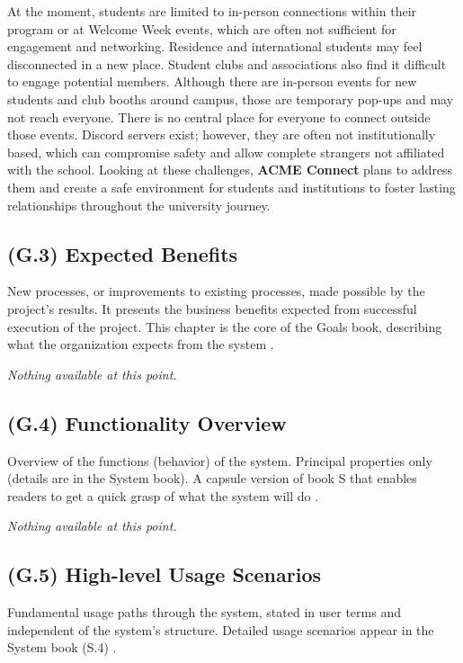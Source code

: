 \documentclass[12pt,letterpaper]{article}
\begin{document}
At the moment, students are limited to in-person connections within their program or at Welcome Week events, which are often not sufficient for engagement and networking. Residence and international students may feel disconnected in a new place. Student clubs and associations also find it difficult to engage potential members. Although there are in-person events for new students and club booths around campus, those are temporary pop-ups and may not reach everyone. There is no central place for everyone to connect outside those events. Discord servers exist; however, they are often not institutionally based, which can compromise safety and allow complete strangers not affiliated with the school. Looking at these challenges, \textbf{ACME Connect} plans to address them and create a safe environment for students and institutions to foster lasting relationships throughout the university journey.

\subsection{(G.3) Expected Benefits}
New processes, or improvements to existing processes, made possible by the project’s results. It presents the business benefits expected from successful execution of the project. This chapter is the core of the Goals book, describing what the organization expects from the system \cite{meyer2022}.

\textit{Nothing available at this point.}

\subsection{(G.4) Functionality Overview}
Overview of the functions (behavior) of the system. Principal properties only (details are in the System book). A capsule version of book S that enables readers to get a quick grasp of what the system will do \cite{meyer2022}.

\textit{Nothing available at this point.}

\subsection{(G.5) High-level Usage Scenarios}
Fundamental usage paths through the system, stated in user terms and independent of the system’s structure. Detailed usage scenarios appear in the System book (S.4) \cite{meyer2022}.

\begin{center}
\end{center}
\end{document}

